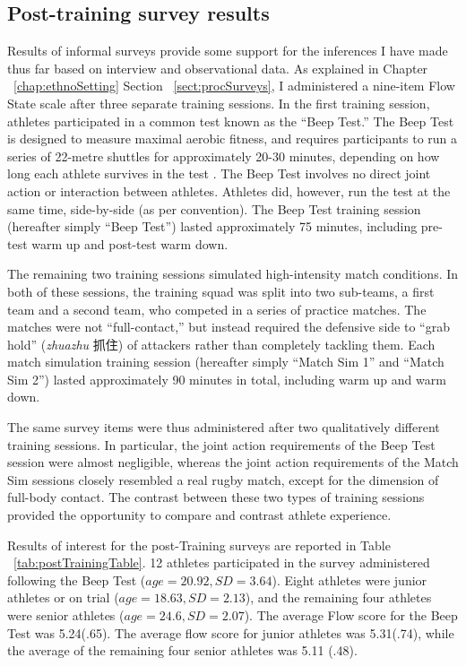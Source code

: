 \begin{CJK}{UTF8}{gbsn}
\subsection{Post-training survey results}
Results of informal surveys provide some support for the inferences I have made thus far based on interview and observational data. As explained in Chapter ~\ref{chap:ethnoSetting} Section ~\ref{sect:procSurveys}, I administered a nine-item Flow State scale after three separate training sessions.  In the first training session, athletes participated in a common test known as the ``Beep Test.''  The Beep Test is designed to measure maximal aerobic fitness, and requires participants to run a series of 22-metre shuttles for approximately 20-30 minutes, depending on how long each athlete survives in the test \citep[see][]{Stickland2003}.  The Beep Test involves no direct joint action or interaction between athletes.  Athletes did, however, run the test at the same time, side-by-side (as per convention).  The Beep Test training session (hereafter simply ``Beep Test'') lasted approximately 75 minutes, including pre-test warm up and post-test warm down.

The remaining two training sessions simulated high-intensity match conditions. In both of these sessions, the training squad was split into two sub-teams, a first team and a second team, who competed in a series of practice matches.  The matches were not ``full-contact,'' but instead required the defensive side to ``grab hold'' (\textit{zhuazhu} 抓住) of attackers rather than completely tackling them.  Each match simulation training session (hereafter simply ``Match Sim 1'' and ``Match Sim 2'') lasted approximately 90 minutes in total, including warm up and warm down.

The same survey items were thus administered after two qualitatively different training sessions.  In particular, the joint action requirements of the Beep Test session were almost negligible, whereas the joint action requirements of the Match Sim sessions closely resembled a real rugby match, except for the dimension of full-body contact.  The contrast between these two types of training sessions provided the opportunity to compare and contrast athlete experience.


  

Results of interest for the post-Training surveys are reported in Table ~\ref{tab:postTrainingTable}.  12 athletes participated in the survey administered following the Beep Test ($age = 20.92, SD = 3.64$). Eight athletes were junior athletes or on trial ($age = 18.63, SD = 2.13$), and the remaining four athletes were senior athletes ($age = 24.6, SD = 2.07$).  The average Flow score for the Beep Test was 5.24(.65).  The average flow score for junior athletes was 5.31(.74), while the average of the remaining four senior athletes was 5.11 (.48).


\end{CJK}

